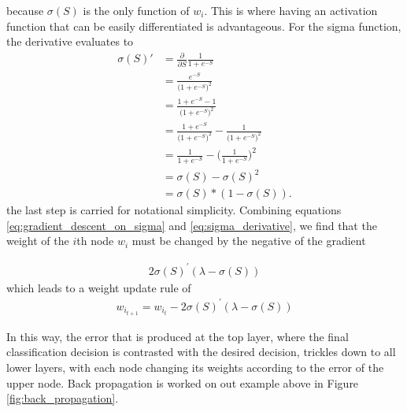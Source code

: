 because $\sigma(S)$ is the only function of $w_i$. This is where having an activation function that can be easily differentiated is advantageous. For the sigma function, the derivative evaluates to
\begin{align}
\label{eq:sigma_derivative}
\sigma(S)\prime &=  \frac{\partial }{\partial S}{\frac{1}{1+e^{-S}}} \\
&= \frac{e^{-S}}{\Big({1+e^{-S}}\Big)^2} \\
&= \frac{1 + e^{-S} - 1}{\Big({1+e^{-S}}\Big)^2} \\
&= \frac{1 + e^{-S}}{\Big({1+e^{-S}}\Big)^2} - \frac{1}{\Big({1+e^{-S}}\Big)^2} \\
&= \frac{1}{{1+e^{-S}}} - \Big(\frac{1}{{1+e^{-S}}}\Big)^2 \\
&= \sigma(S) - \sigma(S)^2 \\
&= \sigma(S) * (1-\sigma(S)).
\label{eq:sigma_derivative}
\end{align}
the last step is carried for notational simplicity. Combining equations \ref{eq:gradient_descent_on_sigma} and \ref{eq:sigma_derivative}, we find that the weight of the $i$th node $w_i$ must be changed by the negative of the gradient

\begin{align*}
  2\sigma(S)^\prime(\lambda - \sigma(S))
\end{align*}
which leads to a weight update rule of 
\begin{align}
  w_{i_{t+1}} = w_{i_t} - 2\sigma(S)^\prime(\lambda - \sigma(S))
  \label{eq:update_rule_for_sigma}
\end{align}

In this way, the error that is produced at the top layer, where the final classification decision is contrasted with the desired decision, trickles down to all lower layers, with each node changing its weights according to the error of the upper node. Back propagation is worked on out example above in Figure \ref{fig:back_propagation}.


